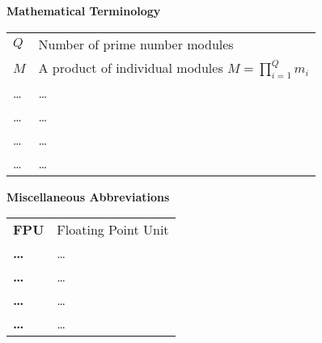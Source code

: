 \noindent\textbf{Mathematical Terminology}\\

\begin{tabular}{ll}
$Q$ & Number of prime number modules\\
$M$ & A product of individual modules $M=\prod\limits_{i=1}^Q m_i$\\
\dots & \dots\\
\dots & \dots\\
\dots & \dots\\
\dots & \dots\\
\end{tabular}
\vskip 1cm

\noindent\textbf{Miscellaneous Abbreviations}\\

\begin{tabular}{ll}
\textbf{FPU} & Floating Point Unit\\
\textbf{\dots} & \dots\\
\textbf{\dots} & \dots\\
\textbf{\dots} & \dots\\
\textbf{\dots} & \dots\\
\end{tabular}
\vskip 1cm
